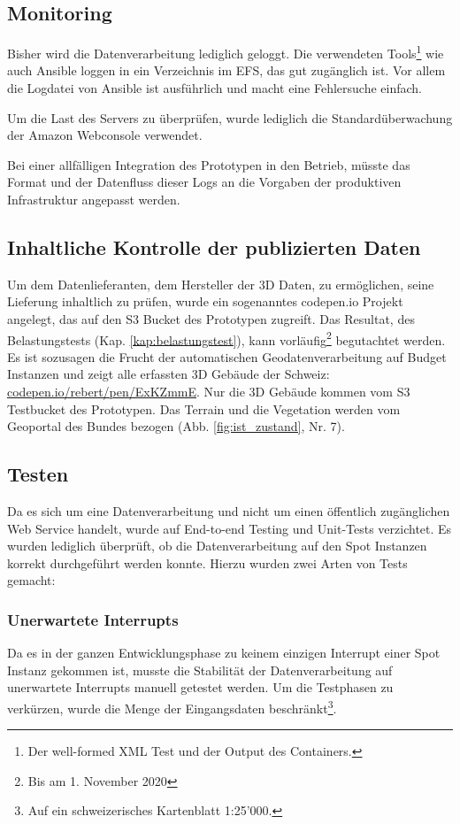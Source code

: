 \subsection{Monitoring}
Bisher wird die Datenverarbeitung lediglich geloggt. Die verwendeten Tools\footnote{Der well-formed XML Test und der Output des Containers.} wie auch Ansible loggen in ein Verzeichnis im EFS, das gut zugänglich ist. Vor allem die Logdatei von Ansible ist ausführlich und macht eine Fehlersuche einfach.

Um die Last des Servers zu überprüfen, wurde lediglich die Standardüberwachung der Amazon Webconsole verwendet.

Bei einer allfälligen Integration des Prototypen in den Betrieb, müsste das Format und der Datenfluss dieser Logs an die Vorgaben der produktiven Infrastruktur angepasst werden.


\subsection{Inhaltliche Kontrolle der publizierten Daten}\label{kap:inhaltlich}
Um dem Datenlieferanten, dem Hersteller der 3D Daten, zu ermöglichen, seine Lieferung inhaltlich zu prüfen, wurde ein sogenanntes codepen.io Projekt angelegt, das auf den S3 Bucket des Prototypen zugreift. Das Resultat, des Belastungstests (Kap. \ref{kap:belastungstest}), kann vorläufig\footnote{Bis am 1. November 2020} begutachtet werden. Es ist sozusagen die Frucht der automatischen Geodatenverarbeitung auf Budget Instanzen und zeigt alle erfassten 3D Gebäude der Schweiz:
\href{https://codepen.io/rebert/pen/ExKZmmE}{codepen.io/rebert/pen/ExKZmmE}. Nur die 3D Gebäude kommen vom S3 Testbucket des Prototypen. Das Terrain und die Vegetation werden vom Geoportal des Bundes bezogen (Abb. \ref{fig:ist_zustand}, Nr. 7).

\subsection{Testen}
Da es sich um eine Datenverarbeitung und nicht um einen öffentlich zugänglichen Web Service handelt, wurde auf End-to-end Testing und Unit-Tests verzichtet. Es wurden lediglich überprüft, ob die Datenverarbeitung auf den Spot Instanzen korrekt durchgeführt werden konnte. Hierzu wurden zwei Arten von Tests gemacht:

\subsubsection{Unerwartete Interrupts}
Da es in der ganzen Entwicklungsphase zu keinem einzigen Interrupt einer Spot Instanz gekommen ist, musste die Stabilität der Datenverarbeitung auf unerwartete Interrupts manuell getestet werden. Um die Testphasen zu verkürzen, wurde die Menge der Eingangsdaten beschränkt\footnote{Auf ein schweizerisches Kartenblatt 1:25'000.}.

